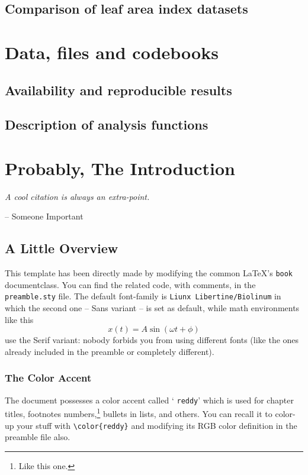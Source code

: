 \documentclass[12pt,a4paper,twoside]{book}
\begin{document}
\section{Comparison of leaf area index datasets}
	
	\chapter{Data, files and codebooks}
	
\section{Availability and reproducible results}
	
\section{Description of analysis functions}

	\chapter*{Probably, The Introduction} 
	\epigraph{\it A cool citation is always an extra-point.}{-- Someone Important}
	\minitoc
\section*{A Little Overview}
This template has been directly made by modifying the common \LaTeX 's {\color{reddy} \verb|book|} documentclass. You can find the related code, with comments, in the {\color{reddy} \verb|preamble.sty|} file. The default font-family is {\color{reddy} \verb|Liunx Libertine/Biolinum|} in which the second one -- Sans variant -- is set as default, while math environments like this
$$x(t)=A\sin(\omega t + \phi)$$
use the Serif variant: nobody forbids you from using different fonts (like the ones already included in the preamble or completely different).
\subsection*{The Color Accent}
The document possesses a color accent called ‘{\color{reddy} \verb|reddy|}’ which is used for chapter titles, footnotes numbers,\footnote{Like this one.} bullets in lists, and others. You can recall it to color-up your stuff with {\color{reddy} \verb|\color{reddy}|} and modifying its RGB color definition in the preamble file also.
\end{document}
